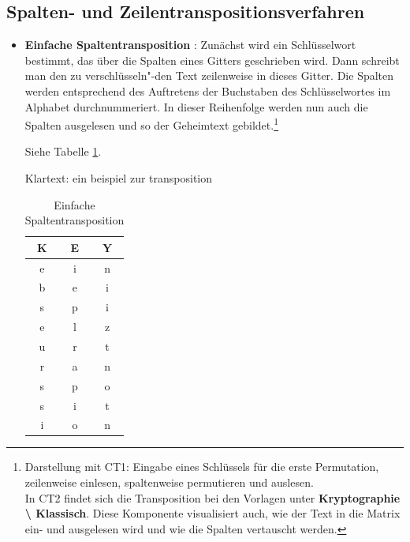 \begin{refsegment}
\subsection[Spalten- und Zeilentranspositionsverfahren]
    {Spalten- und Zeilentranspositionsverfahren\footnotemark}

\begin{itemize}\sloppy

\item {\bf Einfache Spaltentransposition} \cite{Savard1999}: Zunächst wird
   ein Schlüsselwort bestimmt, das über die Spalten eines Gitters geschrieben
   wird. Dann schreibt man den zu verschlüsseln"-den Text zeilenweise in dieses
   Gitter.
   Die Spalten werden entsprechend des Auftretens der Buchstaben des
   Schlüsselwortes im Alphabet durchnummeriert. In dieser Reihenfolge werden
   nun auch die Spalten ausgelesen und so der Geheimtext gebildet.\footnote{%
   Darstellung mit CT1: Eingabe eines Schlüssels für die erste Permutation,
   zeilenweise einlesen, spaltenweise permutieren und auslesen.\\
   In CT2 findet sich die Transposition bei den Vorlagen unter
   {\bf Kryptographie \textbackslash{} Klassisch}. Diese Komponente visualisiert
   auch, wie der Text in die Matrix ein- und ausgelesen wird und wie die Spalten
   vertauscht werden.
   }

   Siehe Tabelle \ref{PaP_SimpColTransp_table-reference}.
	
   Klartext: ein beispiel zur transposition

   \begin{table}[ht]
   \begin{center}
   \begin{tabular}{|c|c|c|}
   \hline
	K & E & Y \\
   \hline
	e & i & n \\
	b & e & i \\
	s & p & i \\
	e & l & z \\
	u & r & t \\
	r & a & n \\
	s & p & o \\
	s & i & t \\
	i & o & n \\
   \hline
   \end{tabular}
   \caption{Einfache Spaltentransposition}
   \label{PaP_SimpColTransp_table-reference}
   \end{center}
   \end{table}


\end{itemize}
\end{refsegment}

